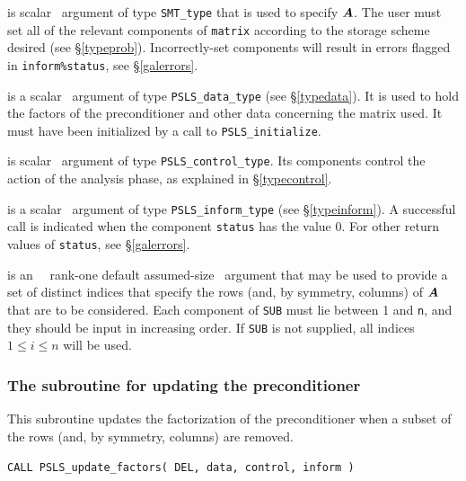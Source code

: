 \documentclass{galahad}
\newcommand{\packagename}{PSLS}
\begin{document}
\begin{description}
 is scalar \intentin\ argument of type {\tt SMT\_type}
that is used to specify ${\bm{A}}$.
The user must set all of the relevant components of {\tt matrix} according
to the storage scheme desired (see \S\ref{typeprob}).
Incorrectly-set components will result in errors
flagged in {\tt inform\%status}, see \S\ref{galerrors}.

 is a scalar \intentinout\ argument of type
{\tt \packagename\_data\_type}
(see \S\ref{typedata}). It is used to hold the factors of the preconditioner 
and other data concerning the matrix used.
It must have been initialized by a call to
{\tt \packagename\_ini\-tialize}.

 is scalar \intentin\ argument of type
{\tt \packagename\_control\_type}. Its components control the action
of the analysis phase, as explained in
\S\ref{typecontrol}.

 is a scalar \intentinout\ argument of type
{\tt \packagename\_inform\_type}
(see \S\ref{typeinform}).
A successful call is indicated when the  component {\tt status} has the value 0.
For other return values of {\tt status}, see \S\ref{galerrors}.

 is an \optional\ \intentin\ rank-one default assumed-size 
\integer\ argument that may be used to provide a set of distinct indices
that specify the rows (and, by symmetry, columns) of ${\bm{A}}$ that are 
to be considered. Each component of {\tt SUB} must lie between 1 and {\tt n},
and they should be input in increasing order.
If {\tt SUB} is not supplied, all indices $1 \leq i \leq n$ will be used. 
\end{description}


\subsubsection{The subroutine for updating the preconditioner}
This subroutine updates the factorization of the preconditioner
when a subset of the rows (and, by symmetry, columns) are removed.

\hskip0.5in
{\tt CALL \packagename\_update\_factors( DEL, data, control, inform )}
\end{document}
